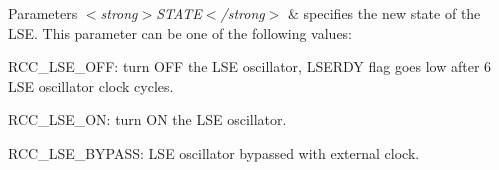 \begin{DoxyParams}{Parameters}
{\em $<$strong$>$\+S\+T\+A\+T\+E$<$/strong$>$} & specifies the new state of the L\+SE. This parameter can be one of the following values\+: \begin{DoxyItemize}
\item R\+C\+C\+\_\+\+L\+S\+E\+\_\+\+O\+FF\+: turn O\+FF the L\+SE oscillator, L\+S\+E\+R\+DY flag goes low after 6 L\+SE oscillator clock cycles. \item R\+C\+C\+\_\+\+L\+S\+E\+\_\+\+ON\+: turn ON the L\+SE oscillator. \item R\+C\+C\+\_\+\+L\+S\+E\+\_\+\+B\+Y\+P\+A\+SS\+: L\+SE oscillator bypassed with external clock. \end{DoxyItemize}
\\
\hline
\end{DoxyParams}
